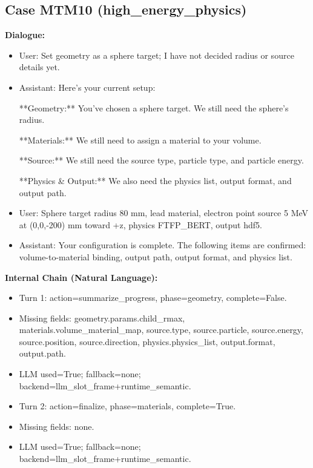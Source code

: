 \documentclass[11pt]{ctexart}
\begin{document}
\subsection{Case MTM10 (high\_energy\_physics)}
\textbf{Dialogue:}
\begin{itemize}
\item User: Set geometry as a sphere target; I have not decided radius or source details yet.
\item Assistant: Here's your current setup:

**Geometry:** You've chosen a sphere target. We still need the sphere's radius.

**Materials:** We still need to assign a material to your volume.

**Source:** We still need the source type, particle type, and particle energy.

**Physics \& Output:** We also need the physics list, output format, and output path.
\item User: Sphere target radius 80 mm, lead material, electron point source 5 MeV at (0,0,-200) mm toward +z, physics FTFP\_BERT, output hdf5.
\item Assistant: Your configuration is complete. The following items are confirmed: volume-to-material binding, output path, output format, and physics list.
\end{itemize}
\textbf{Internal Chain (Natural Language):}
\begin{itemize}
\item Turn 1: action=summarize\_progress, phase=geometry, complete=False.
\item Missing fields: geometry.params.child\_rmax, materials.volume\_material\_map, source.type, source.particle, source.energy, source.position, source.direction, physics.physics\_list, output.format, output.path.
\item LLM used=True; fallback=none; backend=llm\_slot\_frame+runtime\_semantic.
\item Turn 2: action=finalize, phase=materials, complete=True.
\item Missing fields: none.
\item LLM used=True; fallback=none; backend=llm\_slot\_frame+runtime\_semantic.
\end{itemize}
\end{document}
